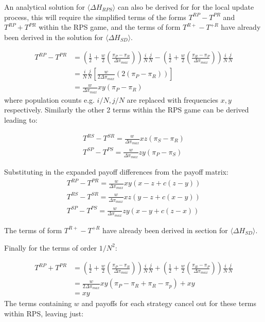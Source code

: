 \documentclass[./main.tex]{subfiles}
\begin{document}
An analytical solution for $\langle \Delta H_{RPS} \rangle$ can also be 
derived for for the local update process, this will require 
the simplified terms of the forms $T^{RP} - T^{PR}$ and
$T^{RP} + T^{PR}$ within the RPS game, and the terms of form 
$T^{R+} - T^{+R}$ have already been derived in the solution for 
$\langle \Delta H_{SD} \rangle$.


\begin{align}
T^{RP} - T^{PR} &= \left(\frac{1}{2} + \frac{w}{2}\left(\frac{\pi_P - \pi_R}{\Delta \pi_{max}}\right)\right)\frac{i}{N} \frac{j}{N} 
- \left(\frac{1}{2} + \frac{w}{2}\left(\frac{\pi_R - \pi_P}{\Delta \pi_{max}}\right)\right)\frac{i}{N} \frac{j}{N} \nonumber \nonumber\\
&= \frac{i}{N} \frac{j}{N} \left[\frac{w}{2\Delta \pi_{max}} \left(2(\pi_P - \pi_R)\right)\right] \nonumber \nonumber\\
&= \frac{w}{\Delta \pi_{max}}xy(\pi_P - \pi_R)\nonumber
\end{align}
where population counts e.g. $i/N, j/N$ are replaced with frequencies $x, y$ respectively. 
Similarly the other 2 terms within the RPS game can be derived leading to:

\begin{align}
T^{RS} - T^{SR} = \frac{w}{\Delta \pi_{max}}xz(\pi_S - \pi_R)\nonumber \\
T^{SP} - T^{PS} = \frac{w}{\Delta \pi_{max}}zy(\pi_P - \pi_S)\nonumber
\end{align}

Substituting in the expanded payoff differences from the payoff matrix:
\begin{align}
T^{RP} - T^{PR} = \frac{w}{\Delta \pi_{max}}xy(x - z + c(z-y))\nonumber \\
T^{RS} - T^{SR} = \frac{w}{\Delta \pi_{max}}xz(y - z + c(x-y))\nonumber \\
T^{SP} - T^{PS} = \frac{w}{\Delta \pi_{max}}zy(x - y + c(z-x)) \nonumber
\end{align}

The terms of form $T^{R+} - T^{+R}$ have already been derived in section for $\langle \Delta H_{SD} \rangle$.

Finally for the terms of order $1/N^2$:

\begin{align}
T^{RP} + T^{PR} &= \left(\frac{1}{2} + \frac{w}{2}\left(\frac{\pi_P - \pi_R}{\Delta \pi_{max}}\right)\right)\frac{i}{N} \frac{j}{N} 
+ \left(\frac{1}{2} + \frac{w}{2}\left(\frac{\pi_R - \pi_P}{\Delta \pi_{max}}\right)\right)\frac{i}{N} \frac{j}{N} \nonumber \\
&= \frac{w}{2\Delta \pi_{max}}xy\left(\pi_P - \pi_R + \pi_R - \pi_p \right) + xy \nonumber\\
&= xy \nonumber
\end{align}
The terms containing $w$ and payoffs for each strategy cancel out for these terms within RPS, leaving just:
\end{document}
